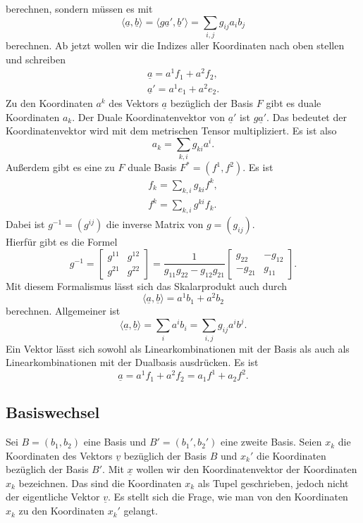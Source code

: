 \documentclass[a4paper,10pt,fleqn,twocolumn,twoside]{article}
\begin{document}
\noindent
berechnen, sondern müssen es mit
\[\langle\underline a,\underline b\rangle
= \langle g\underline a',\underline b'\rangle
= \sum_{i,j} g_{ij}a_ib_j\]
\noindent
berechnen. Ab jetzt wollen wir die Indizes aller Koordinaten
nach oben stellen und schreiben
\begin{gather*}
\underline a = a^1f_1+a^2f_2,\\
\underline a'= a^1e_1+a^2e_2.
\end{gather*}
\noindent
Zu den Koordinaten $a^k$ des Vektors $\underline a$ bezüglich der
Basis $F$ gibt es duale Koordinaten $a_k$. Der Duale
Koordinatenvektor von $\underline a'$ ist $g\underline a'$.
Das bedeutet der Koordinatenvektor wird mit dem metrischen Tensor
multipliziert. Es ist also
\[a_k = \sum_{k,i}g_{ki}a^i.\]
\noindent
Außerdem gibt es eine zu $F$ duale Basis $F^\ast=(f^1,f^2)$.
Es ist
\begin{gather*}
f_k = \sum_{k,i}g_{ki}f^k,\\
f^k = \sum_{k,i}g^{ki}f_k.
\end{gather*}
\noindent
Dabei ist $g^{-1} = (g^{ij})$ die inverse Matrix von
$g=(g_{ij})$.\\
Hierfür gibt es die Formel
\[g^{-1} = \begin{bmatrix}
g^{11} & g^{12}\\
g^{21} & g^{22}
\end{bmatrix}
= \frac{1}{g_{11}g_{22}-g_{12}g_{21}}
\begin{bmatrix}
g_{22} & -g_{12}\\
-g_{21} & g_{11}
\end{bmatrix}.\]
\noindent
Mit diesem Formalismus lässt sich das Skalarprodukt auch durch
\[\langle\underline a,\underline b\rangle = a^1b_1+a^2b_2\]
\noindent
berechnen. Allgemeiner ist
\[\langle\underline a,\underline b\rangle
= \sum_{i} a^ib_i = \sum_{i,j}g_{ij}a^ib^j.\]
\noindent
Ein Vektor lässt sich sowohl als Linearkombinationen mit der Basis
als auch als Linearkombinationen mit der Dualbasis ausdrücken. Es ist
\[\underline a = a^1f_1+a^2f_2 = a_1f^1+a_2f^2.\]

\subsection{Basiswechsel}

Sei $B=(b_1,b_2)$ eine Basis und $B'=(b_1',b_2')$ eine zweite
Basis. Seien $x_k$ die Koordinaten des Vektors $\underline v$
bezüglich der Basis $B$ und $x_k'$ die Koordinaten bezüglich der
Basis $B'$. Mit $\underline x$ wollen wir den Koordinatenvektor
der Koordinaten $x_k$ bezeichnen. Das sind die Koordinaten $x_k$
als Tupel geschrieben, jedoch nicht der
eigentliche Vektor $\underline v$. Es stellt sich die Frage, wie man
von den Koordinaten $x_k$ zu den Koordinaten $x_k'$ gelangt.
\end{document}
